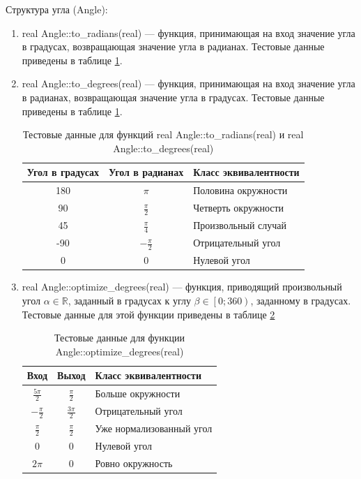 Структура угла (Angle):
\begin{enumerate}
	\item real Angle::to\_radians(real) --- функция, принимающая на вход значение угла в градусах, возвращающая значение угла в радианах. Тестовые данные приведены в таблице \ref{tbl:to_radians}.
	\item real Angle::to\_degrees(real) --- функция, принимающая на вход значение угла в радианах, возвращающая значение угла в градусах. Тестовые данные приведены в таблице \ref{tbl:to_radians}.
	\begin{table}[!ht]
		\centering
		\caption{Тестовые данные для функций real Angle::to\_radians(real) и real Angle::to\_degrees(real)}
		\label{tbl:to_radians}
		\begin{tabular}{|c|c|l|}
			\hline
			Угол в градусах & Угол в радианах & Класс эквивалентности \\
			\hline
			180	& $\pi$	& Половина окружности \\
			90	& $\frac{\pi}{2}$ & Четверть окружности \\
			45	& $\frac{\pi}{4}$ & Произвольный случай \\
			-90 & $-\frac{\pi}{2}$ & Отрицательный угол \\
			0	& 0 & Нулевой угол \\
			\hline
		\end{tabular}
	\end{table}
	
	\item real Angle::optimize\_degrees(real) --- функция, приводящий произвольный угол $\alpha\in\mathbb{R}$, заданный в градусах к углу $\beta\in\left[0; 360\right)$, заданному в градусах. Тестовые данные для этой функции приведены в таблице \ref{tbl:optimize_radians}
	\begin{table}[!ht]
		\centering
		\caption{Тестовые данные для функции Angle::optimize\_degrees(real)}
		\label{tbl:optimize_radians}
		\begin{tabular}{|c|c|l|}
			\hline
			Вход & Выход & Класс эквивалентности \\
			\hline
			$\frac{5\pi}{2}$ & $\frac{\pi}{2}$ & Больше окружности \\
			$-\frac{\pi}{2}$ & $\frac{3\pi}{2}$	& Отрицательный угол \\
			$\frac{\pi}{2}$ & $\frac{\pi}{2}$ & Уже нормализованный угол \\
			$0$ & $0$ & Нулевой угол\\
			$2\pi$ & $0$ & Ровно окружность\\
			\hline
		\end{tabular}
	\end{table}
	

\end{enumerate}
